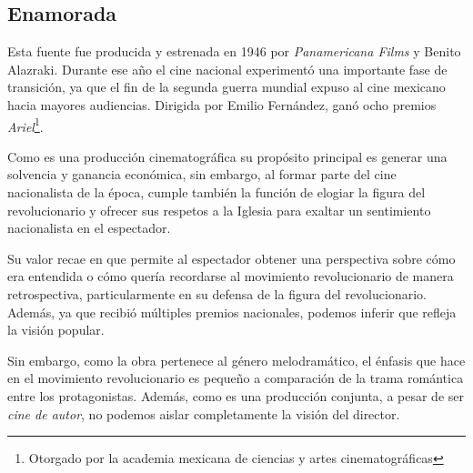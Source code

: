 \subsection{Enamorada}
Esta fuente fue producida y estrenada en 1946  por \emph{Panamericana Films} y Benito Alazraki.
Durante ese año el cine nacional experimentó una importante fase de transición, ya que el fin de la segunda guerra mundial expuso al cine mexicano hacia mayores audiencias.\autocite[12]{garcia_riera_historia_1993}
Dirigida por Emilio Fernández\autocite[59]{garcia_riera_historia_1993}, ganó ocho premios \emph{Ariel}\footnote{Otorgado por la academia mexicana de ciencias y artes cinematográficas}. 

Como es una producción cinematográfica su propósito principal es generar una solvencia y ganancia económica, sin embargo, al formar parte del cine nacionalista de la época, cumple también la función de elogiar la figura del revolucionario y ofrecer sus respetos a la Iglesia para exaltar un sentimiento nacionalista en el espectador\autocite[60]{garcia_riera_historia_1993}. 

Su valor recae en que permite al espectador obtener una perspectiva sobre cómo era entendida o cómo quería recordarse al movimiento revolucionario de manera retrospectiva, particularmente en su defensa de la figura del revolucionario. Además, ya que recibió múltiples premios nacionales, podemos inferir que refleja la visión popular. 

Sin embargo, como la obra pertenece al género melodramático, el énfasis que hace en el movimiento revolucionario es pequeño a comparación de la trama romántica entre los protagonistas. Además, como es una producción conjunta, a pesar de ser \emph{cine de autor}, no podemos aislar completamente la visión del director.  


